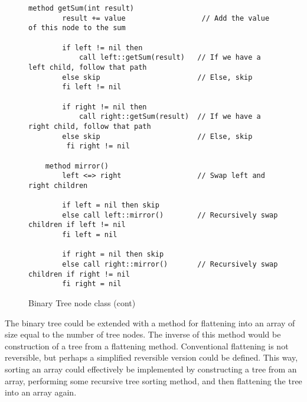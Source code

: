 \begin{figure}[ht!]
    \centering
    \begin{lstlisting}[style = basic, language = roopl] 
    method getSum(int result)
        result += value                  // Add the value of this node to the sum   

        if left != nil then
            call left::getSum(result)   // If we have a left child, follow that path
        else skip                       // Else, skip
        fi left != nil

        if right != nil then
            call right::getSum(result)  // If we have a right child, follow that path
        else skip                       // Else, skip
         fi right != nil

    method mirror()
        left <=> right                  // Swap left and right children

        if left = nil then skip
        else call left::mirror()        // Recursively swap children if left != nil
        fi left = nil

        if right = nil then skip
        else call right::mirror()       // Recursively swap children if right != nil
        fi right = nil 
    \end{lstlisting}
    \caption{Binary Tree node class (cont)}
    \label{fig:binary-tree-node-class-cont}
\end{figure}

The binary tree could be extended with a method for flattening into an array of size equal to the number of tree nodes. The inverse of this method would be construction of a tree from a flattening method. Conventional flattening is not reversible, but perhaps a simplified reversible version could be defined. This way, sorting an array could effectively be implemented by constructing a tree from an array, performing some recursive tree sorting method, and then flattening the tree into an array again.

